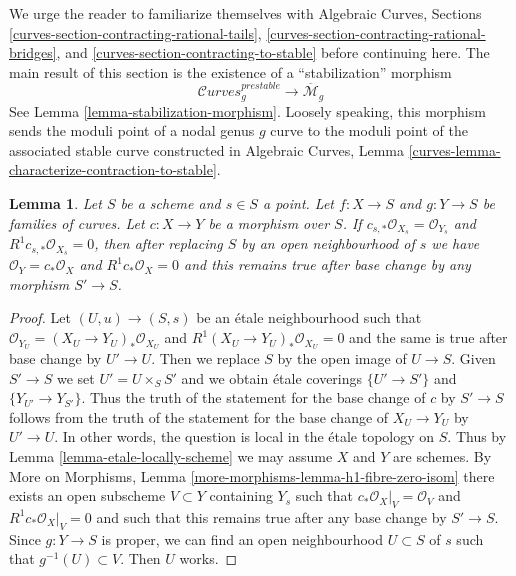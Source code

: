 \documentclass{stacks-project}
\theoremstyle{plain}
\newtheorem{lemma}[subsection]{Lemma}
\theoremstyle{definition}
\theoremstyle{remark}
\numberwithin{equation}{subsection}
\def\Curvesstack{\mathcal{C}\!\mathit{urves}}
\begin{document}
\noindent
We urge the reader to familiarize themselves with
Algebraic Curves, Sections
\ref{curves-section-contracting-rational-tails},
\ref{curves-section-contracting-rational-bridges}, and
\ref{curves-section-contracting-to-stable}
before continuing here. The main result of this section
is the existence of a ``stabilization'' morphism
$$
\Curvesstack^{prestable}_g
\longrightarrow
\overline{\mathcal{M}}_g
$$
See Lemma \ref{lemma-stabilization-morphism}.
Loosely speaking, this morphism sends the moduli point of
a nodal genus $g$ curve to the moduli point of the associated stable
curve constructed in
Algebraic Curves, Lemma \ref{curves-lemma-characterize-contraction-to-stable}.

\begin{lemma}
\label{lemma-contract}
Let $S$ be a scheme and $s \in S$ a point.
Let $f : X \to S$ and $g : Y \to S$ be families of curves.
Let $c : X \to Y$ be a morphism over $S$. If
$c_{s, *}\mathcal{O}_{X_s} = \mathcal{O}_{Y_s}$ and
$R^1c_{s, *}\mathcal{O}_{X_s} = 0$, then
after replacing $S$ by an open neighbourhood of $s$
we have $\mathcal{O}_Y = c_*\mathcal{O}_X$ and $R^1c_*\mathcal{O}_X = 0$
and this remains true after base change by any morphism $S' \to S$.
\end{lemma}

\begin{proof}
Let $(U, u) \to (S, s)$ be an \'etale neighbourhood such that
$\mathcal{O}_{Y_U} = (X_U \to Y_U)_*\mathcal{O}_{X_U}$ and
$R^1(X_U \to Y_U)_*\mathcal{O}_{X_U} = 0$ and the same is true
after base change by $U' \to U$. Then we replace $S$ by the
open image of $U \to S$. Given $S' \to S$ we set $U' = U \times_S S'$
and we obtain \'etale coverings $\{U' \to S'\}$ and
$\{Y_{U'} \to Y_{S'}\}$. Thus the truth of the statement for
the base change of $c$ by $S' \to S$ follows from the truth
of the statement for the base change of $X_U \to Y_U$ by
$U' \to U$. In other words, the question is local in the
\'etale topology on $S$.
Thus by Lemma \ref{lemma-etale-locally-scheme} we may assume
$X$ and $Y$ are schemes. By
More on Morphisms, Lemma \ref{more-morphisms-lemma-h1-fibre-zero-isom}
there exists an open subscheme $V \subset Y$ containing $Y_s$
such that $c_*\mathcal{O}_X|_V = \mathcal{O}_V$ and
$R^1c_*\mathcal{O}_X|_V = 0$ and such that this remains true after
any base change by $S' \to S$. Since $g : Y \to S$ is proper, we can
find an open neighbourhood $U \subset S$ of $s$ such that
$g^{-1}(U) \subset V$. Then $U$ works.
\end{proof}
\end{document}
